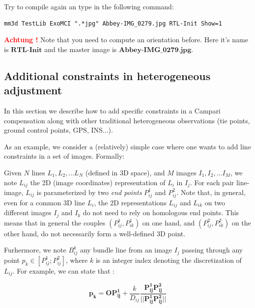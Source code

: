 Try to compile again an type in the following command:
\begin{verbatim}
mm3d TestLib ExoMCI ".*jpg" Abbey-IMG_0279.jpg RTL-Init Show=1
\end{verbatim}

\textbf{\textcolor{red}{Achtung !}} Note that you need to compute an orientation before. Here it's name is $\textbf{RTL-Init}$ and the master image is $\textbf{Abbey-IMG\_0279.jpg}$.
\COM {
}


\newpage
\subsection{Additional constraints in heterogeneous adjustment}

\vspace{0.5cm}

In this section we describe how to add specific constraints in a Campari compensation along with other traditional heterogeneous observations (tie points, ground control points, GPS, INS...). \newline

\noindent As an example, we consider a (relatively) simple case where one wants to add line constraints in a set of images. Formally: \newline

\noindent Given $N$ lines $L_1,L_2,...L_N$ (defined in 3D space), and  $M$ images $I_1, I_2,... I_M$, we note $L_{ij}$ the 2D (image coordinates) representation of $L_i$ in $I_j$. For each pair line-image, $L_{ij}$ is parameterized by two \textit{end points} $P_{ij}^1$ and $P_{ij}^2$. Note that, in general, even for a common 3D line $L_i$, the 2D representations $L_{ij}$ and $L_{ik}$ on two different images $I_j$ and $I_k$ do not need to rely on homologous end points. This means that in general the couples $(P_{ij}^1, P_{ik}^1)$ on one hand, and $(P_{ij}^2, P_{ik}^2)$ on the other hand, do not necessarily form a well-defined 3D point.   \newline

\noindent Furhermore, we note $B_{ij}^k$ any bundle line from an image $I_j$ passing through any point $p_k \in [P_{ij}^1;P_{ij}^2]$, where $k$ is an integer index denoting the discretization of $L_{ij}$. For example, we can state that :  \newline

$$\mathbf{p_k} = \mathbf{OP_{ij}^1} + \frac{k}{D_{ij}} \frac{\mathbf{P_{ij}^1P_{ij}^2}}{||\mathbf{P_{ij}^1P_{ij}^2}||}$$ \newline

